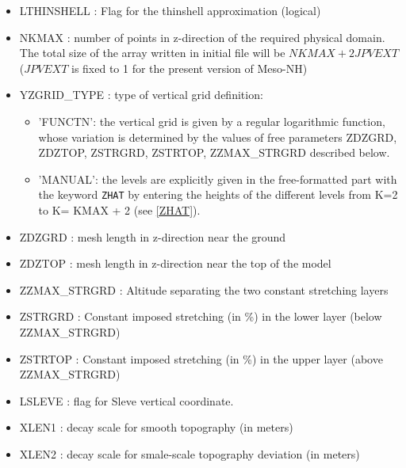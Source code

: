 \begin{itemize}
\item LTHINSHELL : Flag for the thinshell approximation (logical)
\item NKMAX : number of points in z-direction of the required 
              physical domain. The total size of the array written in initial
file will be $NKMAX +2 JPVEXT$ ($JPVEXT$ is fixed to 1 for the present version
 of Meso-NH) 

\item  YZGRID\_TYPE : type of vertical grid definition:
\begin{itemize}
\item 'FUNCTN': the vertical grid is given by a regular logarithmic function, 
whose variation is determined by the values of free parameters ZDZGRD, ZDZTOP,
ZSTRGRD, ZSTRTOP, ZZMAX\_STRGRD described below.
\item 'MANUAL': the levels are explicitly given in the free-formatted
part with the keyword \texttt{ZHAT} by entering the heights of the different levels from  K=2 to K= KMAX + 2 (see \ref{ZHAT}).
\end{itemize}  
 
\item  ZDZGRD : mesh length in z-direction near the ground

\item  ZDZTOP : mesh length in z-direction near the top of the model

\item  ZZMAX\_STRGRD : Altitude separating the two constant stretching layers

\item  ZSTRGRD : Constant imposed stretching (in \%) in the lower layer
(below ZZMAX\_STRGRD)

\item  ZSTRTOP : Constant imposed stretching (in \%) in the upper layer
(above ZZMAX\_STRGRD)

\item  LSLEVE  : flag for Sleve 
vertical coordinate.
\item  XLEN1  : decay scale for
smooth topography (in meters)
\item  XLEN2  : decay scale for
smale-scale topography deviation (in meters)

\end{itemize}

